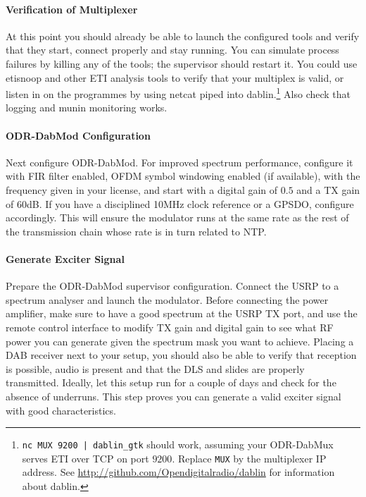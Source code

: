 \paragraph{Verification of Multiplexer}
At this point you should already be able to launch the configured tools and
verify that they start, connect properly and stay running.
You can simulate process failures by killing any of the tools; the supervisor
should restart it.
You could use etisnoop and other ETI analysis tools to verify that your
multiplex is valid, or listen in on the programmes by using netcat piped into
dablin.\footnote{\texttt{nc MUX 9200 | dablin\_gtk} should work, assuming
your ODR-DabMux serves ETI over TCP on port $9200$. Replace \texttt{MUX} by the
multiplexer IP address.
See \url{http://github.com/Opendigitalradio/dablin} for information about
dablin.}
Also check that logging and munin monitoring works.

\paragraph{ODR-DabMod Configuration}
Next configure ODR-DabMod. For improved spectrum performance, configure it with
FIR filter enabled, OFDM symbol windowing enabled (if available), with the
frequency given in your license, and start with a digital gain of $0.5$ and a TX
gain of $60$dB. If you have a disciplined 10MHz clock reference or a GPSDO,
configure accordingly. This will ensure the modulator runs at the same rate as
the rest of the transmission chain whose rate is in turn related to NTP.

\paragraph{Generate Exciter Signal}
Prepare the ODR-DabMod supervisor configuration. Connect the USRP to a spectrum
analyser and launch the modulator. Before connecting the power amplifier, make
sure to have a good spectrum at the USRP TX port, and use the remote control
interface to modify TX gain and digital gain to see what RF power you can
generate given the spectrum mask you want to achieve. Placing a DAB receiver
next to your setup, you should also be able to verify that reception is
possible, audio is present and that the DLS and slides are properly transmitted.
Ideally, let this setup run for a couple of days and check for the absence of
underruns. This step proves you can generate a valid exciter signal with good
characteristics.


